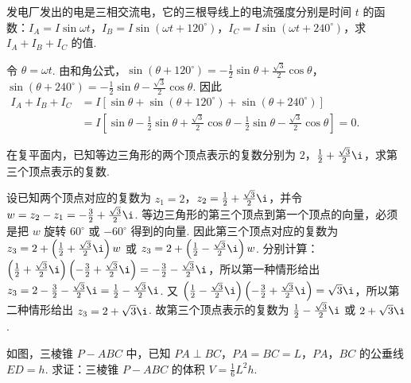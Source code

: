 \documentclass[UTF8,a4paper,oneside,11pt]{ctexbook}
\begin{document}
\begin{problem}
发电厂发出的电是三相交流电，它的三根导线上的电流强度分别是时间 \(t\) 的函数：\(I_A = I\sin \omega t\)，\(I_B = I\sin(\omega t + 120^\circ)\)，\(I_C = I\sin(\omega t + 240^\circ)\)，求 \(I_A + I_B + I_C\) 的值.
\end{problem}

\begin{solution}
令 \(\theta=\omega t\). 由和角公式，\(\sin(\theta+120^\circ)=-\frac12\sin\theta+\frac{\sqrt3}{2}\cos\theta\)，\(\sin(\theta+240^\circ)=-\frac12\sin\theta-\frac{\sqrt3}{2}\cos\theta\). 因此
\(\begin{aligned}
I_A+I_B+I_C
&=I\left[\sin\theta+\sin(\theta+120^\circ)+\sin(\theta+240^\circ)\right]\\
&=I\left[\sin\theta-\frac12\sin\theta+\frac{\sqrt3}{2}\cos\theta-\frac12\sin\theta-\frac{\sqrt3}{2}\cos\theta\right]=0.
\end{aligned}\)
\end{solution}

\begin{problem}
在复平面内，已知等边三角形的两个顶点表示的复数分别为 \(2\)，\(\frac{1}{2} + \frac{\sqrt{3}}{2}\i\)，求第三个顶点表示的复数.
\end{problem}

\begin{solution}
设已知两个顶点对应的复数为 \(z_1=2\)，\(z_2=\frac12+\frac{\sqrt3}{2}\i\)，并令 \(w=z_2-z_1=-\frac32+\frac{\sqrt3}{2}\i\). 等边三角形的第三个顶点到第一个顶点的向量，必须是把 \(w\) 旋转 \(60^\circ\) 或 \(-60^\circ\) 得到的向量. 因此第三个顶点对应的复数为 \(z_3=2+\left(\frac12+\frac{\sqrt3}{2}\i\right)w\) 或 \(z_3=2+\left(\frac12-\frac{\sqrt3}{2}\i\right)w\). 分别计算：
\(\left(\frac12+\frac{\sqrt3}{2}\i\right)\left(-\frac32+\frac{\sqrt3}{2}\i\right)=-\frac32-\frac{\sqrt3}{2}\i\)，所以第一种情形给出 \(z_3=2-\frac32-\frac{\sqrt3}{2}\i=\frac12-\frac{\sqrt3}{2}\i\). 又 \(\left(\frac12-\frac{\sqrt3}{2}\i\right)\left(-\frac32+\frac{\sqrt3}{2}\i\right)=\sqrt3\i\)，所以第二种情形给出 \(z_3=2+\sqrt3\i\). 故第三个顶点表示的复数为 \(\frac12-\frac{\sqrt3}{2}\i\) 或 \(2+\sqrt3\i\).
\end{solution}

\begin{problem}
如图，三棱锥 \(P-ABC\) 中，已知 \(PA \perp BC\)，\(PA = BC = L\)，\(PA\)，\(BC\) 的公垂线 \(ED = h\). 求证：三棱锥 \(P-ABC\) 的体积 \(V = \frac{1}{6}L^2h\).

\end{problem}
\end{document}

